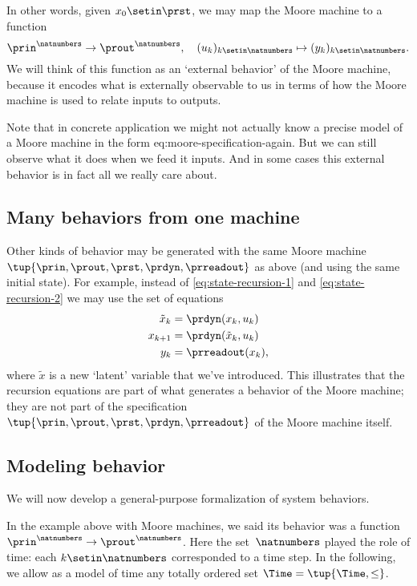 In other words, given $x_0 \setin \prst$, we may map the Moore machine \label{eq:moore-again} to a function
\begin{equation}
    \prin^\natnumbers \to \prout^\natnumbers,  \quad (u_k)_{k \setin \natnumbers} \mapsto (y_k)_{k \setin \natnumbers}.
\end{equation}
We will think of this function as an `external behavior' of the Moore machine, because it encodes what is externally observable to us in terms of how the Moore machine is used to relate inputs to outputs.

Note that in concrete application we might not actually know a precise model of a Moore machine in the form {eq:moore-specification-again}.
But we can still observe what it does when we feed it inputs.
And in some cases this external behavior is in fact all we really care about.

\subsection{Many behaviors from one machine}

Other kinds of behavior may be generated with the same Moore machine $\tup{\prin, \prout, \prst, \prdyn, \prreadout}$ as above (and using the same initial state).
For example, instead of \cref{eq:state-recursion-1} and \cref{eq:state-recursion-2} we may use the set of equations
\begin{align}
    \tilde x_{k} & = \prdyn(x_k, u_k) \\
    x_{k+1}      & = \prdyn(\tilde x_{k}, u_k) \\
    y_{k}        & = \prreadout(x_{k}),
\end{align}
where $\tilde x$ is a new `latent' variable that we've introduced.
This illustrates that the recursion equations are part of what generates a behavior of the Moore machine; they are not part of the specification $\tup{\prin, \prout, \prst, \prdyn, \prreadout}$ of the Moore machine itself.

\subsection{Modeling behavior}

We will now develop a general-purpose formalization of system behaviors.

In the example above with Moore machines, we said its behavior was a function $\prin^\natnumbers \to \prout^\natnumbers$.
Here the set~$\natnumbers$ played the role of time: each $k \setin \natnumbers$ corresponded to a time step.
In the following, we allow as a model of time any totally ordered set $\Time = \tup{\Time, \leq}$.

